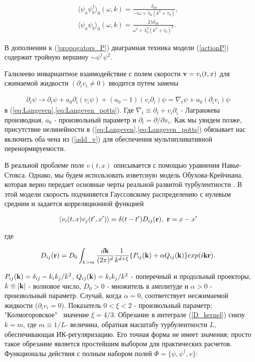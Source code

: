 \documentclass []{rusthesis} %
\def\k{{\bf k}}
\def\bfr{{\bf r}}
\def\bfv{{\bf v}}
\begin{document}
\begin{eqnarray}
\langle \psi_a \psi_b^{\dag}\rangle_0(\omega,k) = \frac{\delta_{ab}}{-i\omega + \lambda_0(k^2+\tau_0)}, \nonumber \\ 
\langle \psi_a \psi_b\rangle_0(\omega,k) = \frac{2\lambda\delta_{ab}}{\omega^2 + \lambda_0^2(k^2+\tau_0)^2}.
\label{propogators_P}
\end{eqnarray}

В дополнении к (\ref{propogators_P}) диаграмная техника модели (\ref{actionP}) содержит тройную вершину $\sim \psi^{\dag} \psi^2$.

Галилеево инвариантное взаимодействие с полем скорости $\bfv={v_i(t,x)}$ для сжимаемой жидкости $(\partial_i v_i \neq 0)$ вводится путем замены

\begin{eqnarray}
\partial_t \psi \rightarrow \partial_t\psi +a_0 \partial_i (v_i \psi)+(a_0-1)(v_i \partial_i)\psi=
\nabla_t \psi+a_0(\partial_i v_i)\psi
\label{add_v}
\end{eqnarray}
в (\ref{eq:Langeven},\ref{eq:Langeven_potts}). Где $\nabla_t\equiv\partial_t+v_i\partial_i$ - Лагранжева производная,
$a_0$ - произвольный параметр и $\partial_i=\partial/\partial x_i$. Как мы увидем позже, присутствие нелинейности в 
(\ref{eq:Langeven},\ref{eq:Langeven_potts}) обязывает нас включить оба чена из (\ref{add_v}) для обеспечения мультипливативной перенормируемости.

В реальной проблеме поле $v(t,x)$ описывается с помощью уравнения Навье-Стокса. Однако, мы будем использовать изветсную
модель Обухова-Крейчнана, которая верно передает основные черты реальной развитой турбулентности \cite{FGV}. 
В этой модели скорость подчиняется Гауссовскому распределению с нулевым средним и задается корреляционной функцией

\begin{eqnarray}
\langle v_i(t,x) v_j(t',x')\rangle = \delta(t-t')D_{ij}(\bfr),\ \bfr=x-x'
\label{v_v_correlator}
\end{eqnarray}

где 

\begin{eqnarray}
D_{ij}(\bfr) = D_0\int_{k>m} \frac{d\k}{(2\pi)^d}
\frac{1}{k^{d+\xi}}\lbrace P_{ij}(\k)+\alpha Q_{ij}(\k)\rbrace exp(i\k\bfr).
\label{D_kernel} 
\end{eqnarray}

$P_{ij}(\k)=\delta_{ij}-k_ik_j/k^2$, $Q_{ij}(\k)=k_ik_j/k^2$ - поперечный и продольный проекторы, $k\equiv|\k|$ - волновое число, $D_0>0$ - множитель в амплитуде и $\alpha>0$ - произвольный параметр.
Случай, когда $\alpha=0$, соответствует несжимаемой жидкости ($\partial_i v_i=0$). Показатель $0<\xi<2$ - произвольный параметр; "Колмогоровское" \ значение $\xi=4/3$. Обрезание в интеграле (\ref{D_kernel}) снизу $k=m$, где $m\equiv1/L$- величина, обратная масштабу турбулентности $L$, обеспечивающая ИК-регуляризацию. Его точная форма не имеет значения; просто такое обрезание является простейшим выбором для практических расчетов. Функционалы действия с полным набором полей $\Phi=\lbrace \psi, \psi^{\dag},v \rbrace$:
\end{document}
